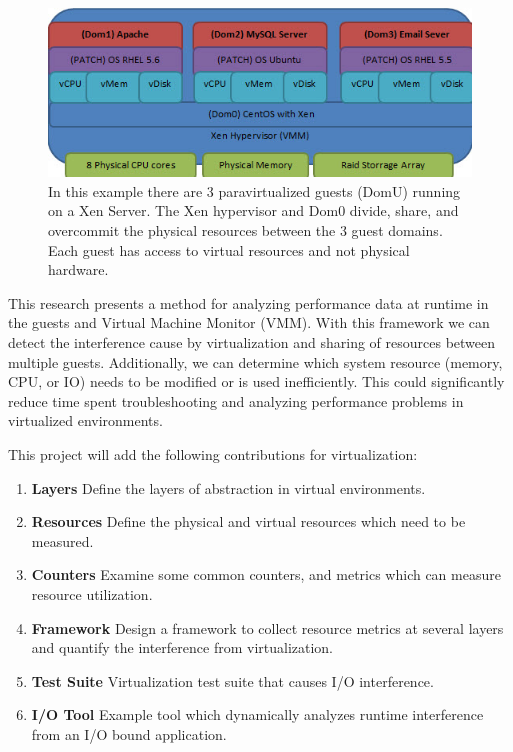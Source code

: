 \begin{figure}[!h]
  \begin{center}
  \includegraphics[width=6in]{images/VirtualizationExample.jpg}
  \caption{In this example there are 3 paravirtualized guests (DomU) running on a Xen Server.  The Xen hypervisor and Dom0 divide, share, and overcommit the physical resources between the 3 guest domains.  Each guest has access to virtual resources and not physical hardware.}
  \label{virtStack}
  \end{center}
\end{figure}

\indent This research presents a method for analyzing performance data at runtime in the guests and Virtual Machine Monitor (VMM).   With this framework we can detect the interference cause by virtualization and sharing of resources between multiple guests.  Additionally, we can determine which system resource (memory, CPU, or IO) needs to be modified or is used inefficiently.  This could significantly reduce time spent troubleshooting and analyzing performance problems in virtualized environments.

\indent This project will add the following contributions for virtualization:
\begin{enumerate}
\item \textbf{Layers} Define the layers of abstraction in virtual environments.
\item \textbf{Resources} Define the physical and virtual resources which need to be measured.
\item \textbf{Counters} Examine some common counters, and metrics which can measure resource utilization.
\item \textbf{Framework} Design a framework to collect resource metrics at several layers and quantify the interference from virtualization.
\item \textbf{Test Suite} Virtualization test suite that causes I/O interference.
\item \textbf{I/O Tool} Example tool which dynamically analyzes runtime interference from an I/O bound application.
\end{enumerate}

